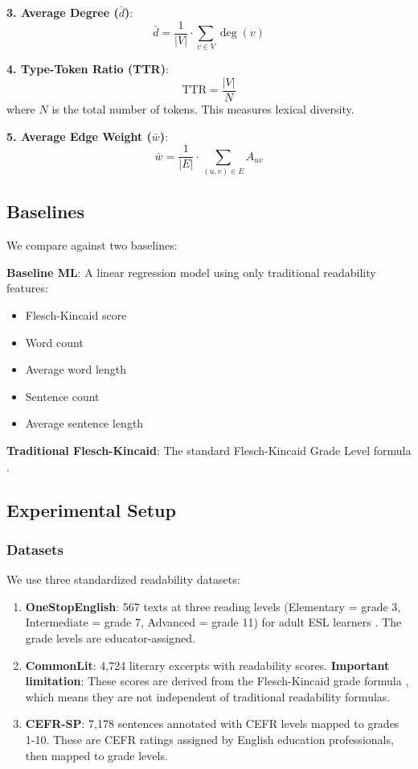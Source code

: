 \documentclass[11pt,letterpaper]{article}
\begin{document}
\textbf{3. Average Degree ($\bar{d}$)}:
\[\bar{d} = \frac{1}{|V|} \cdot \sum_{v \in V} \deg(v)\]

\textbf{4. Type-Token Ratio (TTR)}:
\[\mathrm{TTR} = \frac{|V|}{N}\]
where $N$ is the total number of tokens. This measures lexical diversity.

\textbf{5. Average Edge Weight ($\bar{w}$)}:
\[\bar{w} = \frac{1}{|E|} \cdot \sum_{(u,v) \in E} A_{uv}\]

\subsection{Baselines}

We compare against two baselines:

\textbf{Baseline ML}: A linear regression model using only traditional readability features:
\begin{itemize}
\item Flesch-Kincaid score
\item Word count
\item Average word length
\item Sentence count  
\item Average sentence length
\end{itemize}

\textbf{Traditional Flesch-Kincaid}: The standard Flesch-Kincaid Grade Level formula \cite{Flesch1948}.

\subsection{Experimental Setup}

\subsubsection{Datasets}

We use three standardized readability datasets:

\begin{enumerate}
\item \textbf{OneStopEnglish}: 567 texts at three reading levels (Elementary = grade 3, Intermediate = grade 7, Advanced = grade 11) for adult ESL learners \cite{Vajjala2018}. The grade levels are educator-assigned.

\item \textbf{CommonLit}: 4,724 literary excerpts with readability scores. \textbf{Important limitation}: These scores are derived from the Flesch-Kincaid grade formula \cite{Crossley2022}, which means they are not independent of traditional readability formulas.

\item \textbf{CEFR-SP}: 7,178 sentences annotated with CEFR levels mapped to grades 1-10. These are CEFR ratings assigned by English education professionals, then mapped to grade levels.
\end{enumerate}
\end{document}
